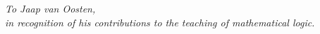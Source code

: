 \clearpage
\thispagestyle{empty}
\begin{flushright}
  \vspace*{\fill}

  \large %

  \emph{To Jaap van Oosten, \\ in recognition of
    his contributions to the teaching of
    mathematical logic.}

  \vspace*{\fill}


\end{flushright}

